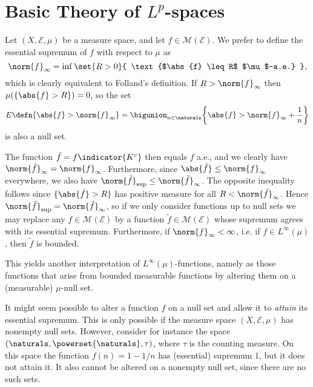 \documentclass[article, a4paper, 11pt, oneside]{memoir}
\numberwithin{equation}{chapter}
\newcommand{\calE}{\mathcal{E}}
\newcommand{\measurable}{\mathcal{M}}
\theoremstyle{nonumberplain}
\begin{document}
\section{Basic Theory of $L^p$-spaces}

\begin{remarkbreak}
	Let $(X,\calE,\mu)$ be a measure space, and let $f \in \measurable(\calE)$. We prefer to define the essential supremum of $f$ with respect to $\mu$ as
	\begin{equation*}
		\norm{f}_\infty
			= \inf \set{ R > 0 }{ \text{$\abs{f} \leq R$ $\mu$-a.e.} },
	\end{equation*}
	which is clearly equivalent to Folland's definition. If $R > \norm{f}_\infty$ then $\mu(\{\abs{f} > R\}) = 0$, so the set
	\begin{equation*}
		E
			\defn \{ \abs{f} > \norm{f}_\infty \}
			= \bigunion_{n\in\naturals} \biggl\{ \abs{f} > \norm{f}_\infty + \frac{1}{n} \biggr\}
	\end{equation*}
	is also a null set.
	
	The function $\tilde f = f \indicator{K^c}$ then equals $f$ a.e., and we clearly have $\norm{\tilde f}_\infty = \norm{f}_\infty$. Furthermore, since $\abs{\tilde f} \leq \norm{f}_\infty$ everywhere, we also have $\norm{\tilde f}_{\sup} \leq \norm{\tilde f}_\infty$. The opposite inequality follows since $\{ \abs{\tilde f} > R \}$ has positive measure for all $R < \norm{\tilde f}_\infty$. Hence $\norm{\tilde f}_{\sup} = \norm{\tilde f}_\infty$, so if we only consider functions up to null sets we may replace any $f \in \measurable(\calE)$ by a function $\tilde f \in \measurable(\calE)$ whose supremum agrees with its essential supremum. Furthermore, if $\norm{f}_\infty < \infty$, i.e. if $f \in L^\infty(\mu)$, then $\tilde f$ is bounded.
	
	This yields another interpretation of $L^\infty(\mu)$-functions, namely as those functions that arise from bounded measurable functions by altering them on a (measurable) $\mu$-null set.

	It might seem possible to alter a function $f$ on a null set and allow it to \emph{attain} its essential supremum. This is only possible if the measure space $(X,\calE,\mu)$ has nonempty null sets. However, consider for instance the space $(\naturals, \powerset{\naturals}, \tau)$, where $\tau$ is the counting measure. On this space the function $f(n) = 1-1/n$ has (essential) supremum $1$, but it does not attain it. It also cannot be altered on a nonempty null set, since there are no such sets.
\end{remarkbreak}
\end{document}
